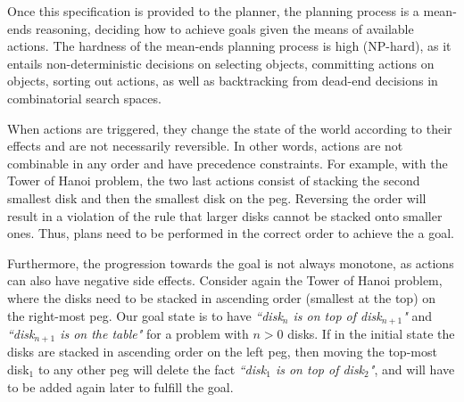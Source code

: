 Once this specification is provided to the planner, the planning process is a mean-ends reasoning, deciding how to achieve goals given the means of available actions. The hardness of the mean-ends planning process is high (NP-hard), as it entails non-deterministic decisions on selecting objects, committing actions on objects, sorting out actions, as well as backtracking from dead-end decisions in combinatorial search spaces.

When actions are triggered, they change the state of the world according to their effects and are not necessarily reversible. In other words, actions are not combinable in any order and have precedence constraints. For example, with the Tower of Hanoi problem, the two last actions consist of stacking the second smallest disk and then the smallest disk on the peg. Reversing the order will result in a violation of the rule that larger disks cannot be stacked onto smaller ones. Thus, plans need to be performed in the correct order to achieve the a goal.

Furthermore, the progression towards the goal is not always monotone, as actions can also have negative side effects. Consider again the Tower of Hanoi problem, where the disks need to be stacked in ascending order (smallest at the top) on the right-most peg. Our goal state is to have \textit{``disk$_{n}$ is on top of disk$_{n+1}$"} and \textit{``disk$_{n+1}$ is on the table"} for a problem with $n>0$ disks. If in the initial state the disks are stacked in ascending order on the left peg, then moving the top-most disk$_1$ to any other peg will delete the fact \textit{``disk$_1$ is on top of disk$_2$"}, and will have to be added again later to fulfill the goal.




